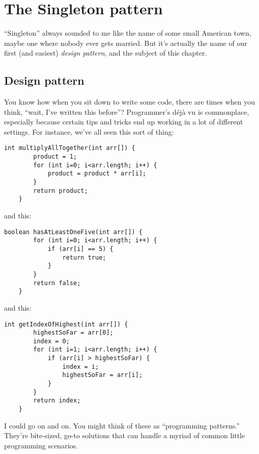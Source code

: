 
\chapter{The Singleton pattern}

``Singleton'' always sounded to me like the name of some small American town,
maybe one where nobody ever gets married. But it's actually the name of our
first (and easiest) \textit{design pattern}, and the subject of this chapter.

\section{Design pattern}

You know how when you sit down to write some code, there are times when you
think, ``wait, I've written this before''? Programmer's d\'{e}j\`{a} vu is
commonplace, especially because certain tips and tricks end up working in
a lot of different settings. For instance, we've all seen this sort of thing:

\vspace{-.1in}
\begin{Verbatim}[fontsize=\small]
    int multiplyAllTogether(int arr[]) {
        product = 1;
        for (int i=0; i<arr.length; i++) {
            product = product * arr[i];
        }
        return product;
    }
\end{Verbatim}

and this:

\pagebreak
\begin{Verbatim}[fontsize=\small]
    boolean hasAtLeastOneFive(int arr[]) {
        for (int i=0; i<arr.length; i++) {
            if (arr[i] == 5) {
                return true;
            }
        }
        return false;
    }
\end{Verbatim}

and this:

\begin{samepage}
\begin{Verbatim}[fontsize=\small]
    int getIndexOfHighest(int arr[]) {
        highestSoFar = arr[0];
        index = 0;
        for (int i=1; i<arr.length; i++) {
            if (arr[i] > highestSoFar) {
                index = i;
                highestSoFar = arr[i];
            }
        }
        return index;
    }
\end{Verbatim}
\end{samepage}

I could go on and on. You might think of these as ``programming patterns.''
They're bite-sized, go-to solutions that can handle a myriad of common little
programming scenarios.

